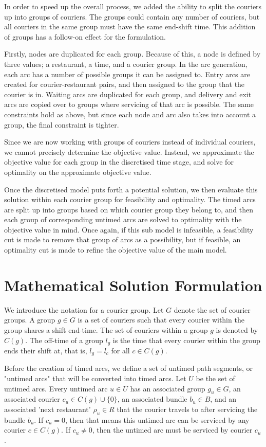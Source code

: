 \documentclass{article}
\begin{document}
In order to speed up the overall process, we added the ability to split the couriers up into groups of couriers. The groups could contain any number of couriers, but all couriers in the same group must have the same end-shift time. This addition of groups has a follow-on effect for the formulation.

Firstly, nodes are duplicated for each group. Because of this, a node is defined by three values; a restaurant, a time, and a courier group. In the arc generation, each arc has a number of possible groups it can be assigned to. Entry arcs are created for courier-restaurant pairs, and then assigned to the group that the courier is in. Waiting arcs are duplicated for each group, and delivery and exit arcs are copied over to groups where servicing of that arc is possible. The same constraints hold as above, but since each node and arc also takes into account a group, the final constraint is tighter.

Since we are now working with groups of couriers instead of individual couriers, we cannot precisely determine the objective value. Instead, we approximate the objective value for each group in the discretised time stage, and solve for optimality on the approximate objective value.

Once the discretised model puts forth a potential solution, we then evaluate this solution within each courier group for feasibility and optimality. The timed arcs are split up into groups based on which courier group they belong to, and then each group of corresponding untimed arcs are solved to optimality with the objective value in mind. Once again, if this sub model is infeasible, a feasibility cut is made to remove that group of arcs as a possibility, but if feasible, an optimality cut is made to refine the objective value of the main model.

\section{Mathematical Solution Formulation}

We introduce the notation for a courier group. Let $G$ denote the set of courier groups. A group $g\in G$ is a set of couriers such that every courier within the group shares a shift end-time. The set of couriers within a group $g$ is denoted by $C(g)$. The off-time of a group $l_g$ is the time that every courier within the group ends their shift at, that is, $l_g=l_c$ for all $c\in C(g)$.

Before the creation of timed arcs, we define a set of untimed path segments, or "untimed arcs" that will be converted into timed arcs. Let $U$ be the set of untimed arcs. Every untimed arc $u\in U$ has an associated group $g_u\in G$, an associated courier $c_u\in C(g)\cup \{0\}$, an associated bundle $b_u\in B$, and an associated 'next restaurant' $\rho_u\in R$ that the courier travels to after servicing the bundle $b_u$. If $c_u=0$, then that means this untimed arc can be serviced by any courier $c\in C(g)$. If $c_u\neq 0$, then the untimed arc must be serviced by courier $c_u$. 
\end{document}
